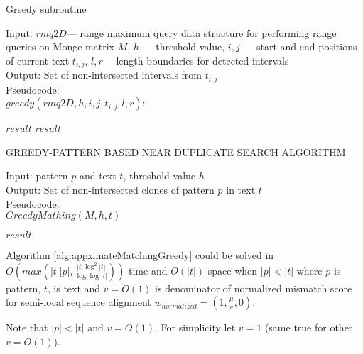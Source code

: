 \begin{algorithm}[H]
\caption{Greedy subroutine}
\label{alg:rec}
Input: $rmq2D$--- range maximum query data structure for performing range queries on Monge matrix $M$, $h$ --- threshold value, $i,j$ --- start and end positions of current text $t_{i,j}$, $l,r$--- length boundaries for detected intervals \\
Output: Set of non-intersected intervals from $t_{i,j}$\\
Pseudocode:\\
$greedy(rmq2D,h, i, j, t_{i,j},l,r ):$

\begin{algorithmic}[1]
\RETURN $result$
\ENDIF
{}
\ENDIF
{}
\ENDIF
\RETURN $result$
\end{algorithmic}
\end{algorithm}


\begin{algorithm}[H]
\caption{GREEDY-PATTERN BASED NEAR DUPLICATE
SEARCH ALGORITHM}
\label{alg:appximateMatchingGreedy}
Input: pattern $p$ and text $t$, threshold value $h$\\
Output: Set of non-intersected clones of pattern $p$ in text $t$\\
Pseudocode:\\
$GreedyMathing(M,h,t)$
\begin{algorithmic}[1]

\RETURN $result$
\end{algorithmic}
\end{algorithm}


\begin{theorem}
Algorithm \ref{alg:appximateMatchingGreedy} could  be solved in
$O(max(|t||p|,\frac{|t| \log^2 |t|}{\log \log |t|} ))$ time and $O(|t| )$ space when $|p|<|t|$ where $p$ is pattern, $t$, is text and $v=O(1)$ is denominator of normalized mismatch score for semi-local sequence alignment
$w_{normalized} = (1,\frac{\mu}{v},0)$.
\end{theorem}
Note that $|p|<|t|$ and $v=O(1)$.
For simplicity let $v=1$ (same true for other $v=O(1)$).


